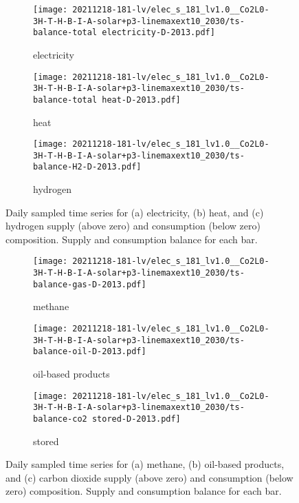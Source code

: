 \begin{figure}
    \centering
    \begin{subfigure}[t]{\textwidth}
        \centering
        \caption{electricity}
        \texttt{[image: 20211218-181-lv/elec\_s\_181\_lv1.0\_\_Co2L0-3H-T-H-B-I-A-solar+p3-linemaxext10\_2030/ts-balance-total electricity-D-2013.pdf]}
    \end{subfigure}
    \begin{subfigure}[t]{\textwidth}
        \centering
        \caption{heat}
        \texttt{[image: 20211218-181-lv/elec\_s\_181\_lv1.0\_\_Co2L0-3H-T-H-B-I-A-solar+p3-linemaxext10\_2030/ts-balance-total heat-D-2013.pdf]}
    \end{subfigure}
    \begin{subfigure}[t]{\textwidth}
        \centering
        \caption{hydrogen}
        \texttt{[image: 20211218-181-lv/elec\_s\_181\_lv1.0\_\_Co2L0-3H-T-H-B-I-A-solar+p3-linemaxext10\_2030/ts-balance-H2-D-2013.pdf]}
    \end{subfigure}
    \caption{Daily sampled time series for (a) electricity, (b) heat, and (c) hydrogen supply (above zero) and consumption (below zero) composition. Supply and consumption balance for each bar.}
    \label{fig:output-ts-1}
\end{figure}

\begin{figure}
    \centering
    \begin{subfigure}[t]{\textwidth}
        \centering
        \caption{methane}
        \texttt{[image: 20211218-181-lv/elec\_s\_181\_lv1.0\_\_Co2L0-3H-T-H-B-I-A-solar+p3-linemaxext10\_2030/ts-balance-gas-D-2013.pdf]}
    \end{subfigure}
    \begin{subfigure}[t]{\textwidth}
        \centering
        \caption{oil-based products}
        \texttt{[image: 20211218-181-lv/elec\_s\_181\_lv1.0\_\_Co2L0-3H-T-H-B-I-A-solar+p3-linemaxext10\_2030/ts-balance-oil-D-2013.pdf]}
    \end{subfigure}
    \begin{subfigure}[t]{\textwidth}
        \centering
        \caption{stored \co}
        \texttt{[image: 20211218-181-lv/elec\_s\_181\_lv1.0\_\_Co2L0-3H-T-H-B-I-A-solar+p3-linemaxext10\_2030/ts-balance-co2 stored-D-2013.pdf]}
    \end{subfigure}
    \caption{Daily sampled time series for (a) methane, (b) oil-based products, and (c) carbon dioxide supply (above zero) and consumption (below zero) composition. Supply and consumption balance for each bar.}
    \label{fig:output-ts-2}
\end{figure}


